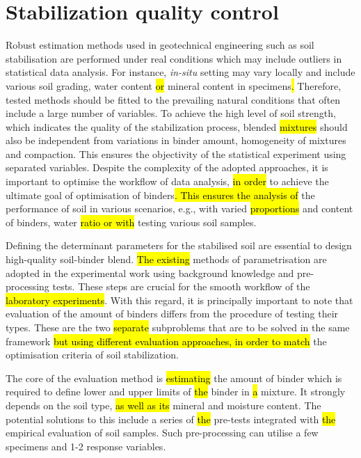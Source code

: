 \documentclass[eprint,
]{actapoly}
\begin{document}
\section{Stabilization quality control}

Robust estimation methods used in geotechnical engineering\hl{ }such as soil stabilisation\hl{ }are performed under real conditions which may include outliers in statistical data analysis. For instance, \emph{in-situ} setting may vary locally and include various soil grading, water content \hl{or} mineral content in specimens\hl{. }Therefore, tested methods should be fitted to the prevailing natural conditions that often include a large number of variables. To achieve the high level of soil strength, which indicates the quality of the stabilization process, blended \hl{mixtures }should also be independent from variations in binder amount, homogeneity of mixtures and compaction. This ensures the objectivity of the statistical experiment using separated variables. Despite the complexity of the adopted approaches, it is important to optimise the workflow of data analysis, \hl{in order }to achieve the ultimate goal of optimisation of binders\hl{. This ensures the analysis of} the performance of soil in various scenarios, e.g., with varied \hl{proportions} and content of binders, water \hl{ratio or with} testing various soil samples.

Defining the determinant parameters for the stabilised soil are essential to design\hl{ }high-quality soil-binder blend. \hl{The existing }methods of parametrisation are adopted in the experimental work using background knowledge and pre-processing tests. These steps are crucial for the smooth workflow of the \hl{laboratory experiments}. With this regard, it is principally important to note that evaluation of the amount of binders differs from the procedure of testing their types. These are the two \hl{separate }subproblems that are to be solved in the same framework \hl{but using different evaluation approaches, in order to match }the optimisation criteria of soil stabilization. 

The core of the evaluation method is \hl{estimating} the amount of binder which is required to define lower and upper limits of \hl{the }binder in \hl{a }mixture. It strongly depends on the soil type, \hl{as well as its }mineral and moisture content. The potential solutions to this include a series of \hl{the }pre-tests integrated with \hl{the }empirical evaluation of soil samples. Such pre-processing can utilise a few specimens and 1-2 response variables. 
\end{document}
